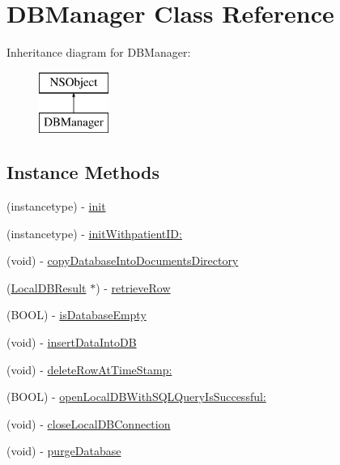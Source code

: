 \hypertarget{interface_d_b_manager}{\section{D\-B\-Manager Class Reference}
\label{interface_d_b_manager}
}
Inheritance diagram for D\-B\-Manager\-:\begin{figure}[H]
\begin{center}
\leavevmode
\includegraphics[height=2.000000cm]{interface_d_b_manager}
\end{center}
\end{figure}
\subsection*{Instance Methods}
\begin{DoxyCompactItemize}
\item 
(instancetype) -\/ \hyperlink{interface_d_b_manager_a0b390c8eab2577c30b2012e14ae821fe}{init}
\item 
(instancetype) -\/ \hyperlink{interface_d_b_manager_a24ba5578b7bcfff67ad5fcffb6c05f7b}{init\-Withpatient\-I\-D\-:}
\item 
(void) -\/ \hyperlink{interface_d_b_manager_a2e49fe020ebf348c2768a4c4a3dcff00}{copy\-Database\-Into\-Documents\-Directory}
\item 
(\hyperlink{interface_local_d_b_result}{Local\-D\-B\-Result} $\ast$) -\/ \hyperlink{interface_d_b_manager_ad6723b4f6b2191eddbcc4bb9bd361fcb}{retrieve\-Row}
\item 
(B\-O\-O\-L) -\/ \hyperlink{interface_d_b_manager_a3c424eba24e9894922714f6154a6dc44}{is\-Database\-Empty}
\item 
(void) -\/ \hyperlink{interface_d_b_manager_a0c354ea19fc86923ba33e5dc32798ca8}{insert\-Data\-Into\-D\-B}
\item 
(void) -\/ \hyperlink{interface_d_b_manager_a28d37edd37bc78b35579d276b8abfd9b}{delete\-Row\-At\-Time\-Stamp\-:}
\item 
(B\-O\-O\-L) -\/ \hyperlink{interface_d_b_manager_ab93660b0ab1caac6cd83b9edc349ddee}{open\-Local\-D\-B\-With\-S\-Q\-L\-Query\-Is\-Successful\-:}
\item 
(void) -\/ \hyperlink{interface_d_b_manager_a768157b5a58c4e400ee1326fe804d2b8}{close\-Local\-D\-B\-Connection}
\item 
(void) -\/ \hyperlink{interface_d_b_manager_aa804a3f4200ce732321d814cf86dbd2b}{purge\-Database}
\end{DoxyCompactItemize}
